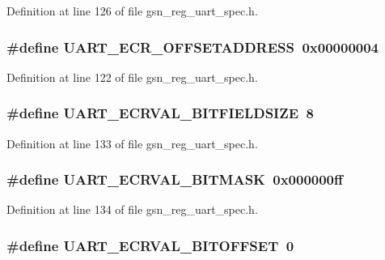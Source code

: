Definition at line 126 of file gsn\_\-reg\_\-uart\_\-spec.h.

\hypertarget{a00575_a77e28c8e5a882bc8120f735dbe755af4}{
\subsubsection[{UART\_\-ECR\_\-OFFSETADDRESS}]{\setlength{\rightskip}{0pt plus 5cm}\#define UART\_\-ECR\_\-OFFSETADDRESS~0x00000004}}
\label{a00575_a77e28c8e5a882bc8120f735dbe755af4}


Definition at line 122 of file gsn\_\-reg\_\-uart\_\-spec.h.

\hypertarget{a00575_adb6ad442239c39503816628d672a76e8}{
\subsubsection[{UART\_\-ECRVAL\_\-BITFIELDSIZE}]{\setlength{\rightskip}{0pt plus 5cm}\#define UART\_\-ECRVAL\_\-BITFIELDSIZE~8}}
\label{a00575_adb6ad442239c39503816628d672a76e8}


Definition at line 133 of file gsn\_\-reg\_\-uart\_\-spec.h.

\hypertarget{a00575_aa7cc5139d083aed00faf9eff3d848b22}{
\subsubsection[{UART\_\-ECRVAL\_\-BITMASK}]{\setlength{\rightskip}{0pt plus 5cm}\#define UART\_\-ECRVAL\_\-BITMASK~0x000000ff}}
\label{a00575_aa7cc5139d083aed00faf9eff3d848b22}


Definition at line 134 of file gsn\_\-reg\_\-uart\_\-spec.h.

\hypertarget{a00575_ac9a534cc01ab594dee0981a299ea6d43}{
\subsubsection[{UART\_\-ECRVAL\_\-BITOFFSET}]{\setlength{\rightskip}{0pt plus 5cm}\#define UART\_\-ECRVAL\_\-BITOFFSET~0}}
\label{a00575_ac9a534cc01ab594dee0981a299ea6d43}


